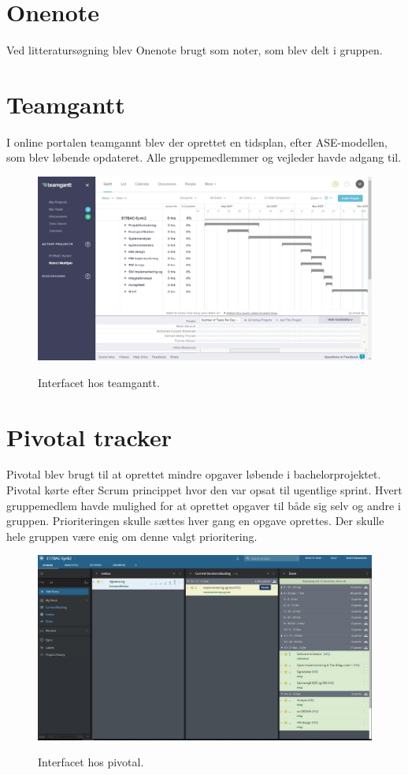 \section{Onenote}
Ved litteratursøgning blev Onenote brugt som noter, som blev delt i gruppen.

\section{Teamgantt}
I online portalen teamgannt blev der oprettet en tidsplan, efter ASE-modellen, som blev løbende opdateret. Alle gruppemedlemmer og vejleder havde adgang til.

\begin{figure}[H]
\centering
{\includegraphics[width=\linewidth]
{Figure/teamgantt}}
\caption{Interfacet hos teamgantt.}
\label{teamgantt}
\end{figure}

\section{Pivotal tracker}
Pivotal blev brugt til at oprettet mindre opgaver løbende i bachelorprojektet. Pivotal kørte efter Scrum princippet hvor den var opsat til ugentlige sprint. Hvert gruppemedlem havde mulighed for at oprettet opgaver til både sig selv og andre i gruppen. Prioriteringen skulle sættes hver gang en opgave oprettes. Der skulle hele gruppen være enig om denne valgt prioritering. 
\begin{figure}[H]
\centering
{\includegraphics[width=\linewidth]
{Figure/pivotal}}
\caption{Interfacet hos pivotal.}
\label{pivotal}
\end{figure}


